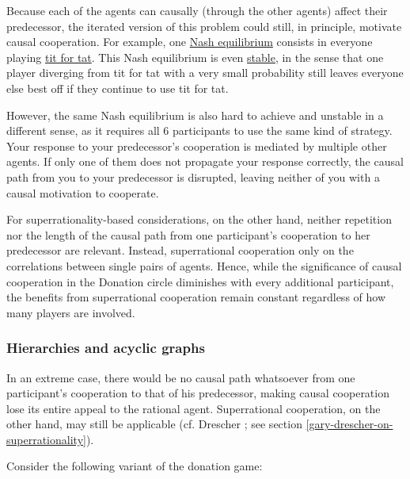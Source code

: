 Because each of the agents can causally (through the other agents)
affect their predecessor, the iterated version of this problem could
still, in principle, motivate causal cooperation. For example, one
\href{https://en.wikipedia.org/wiki/Nash_equilibrium}{Nash
equilibrium} consists in everyone playing
\href{https://en.wikipedia.org/wiki/Tit_for_tat}{tit for tat}.
This Nash equilibrium is even
\href{https://en.wikipedia.org/wiki/Nash_equilibrium\#Stability}{stable},
in the sense that one player diverging from tit for tat with a very
small probability still leaves everyone else best off if they continue
to use tit for tat.

However, the same Nash equilibrium is also hard to achieve and unstable
in a different sense, as it requires all 6 participants to use the same
kind of strategy. Your response to your predecessor's cooperation is
mediated by multiple other agents. If only one of them does not
propagate your response correctly, the causal path from you to your
predecessor is disrupted, leaving neither of you with a causal
motivation to cooperate.

For superrationality-based considerations, on the other hand, neither
repetition nor the length of the causal path from one participant's
cooperation to her predecessor are relevant. Instead, superrational
cooperation only on the correlations between single pairs of agents.
Hence, while the significance of causal cooperation in the Donation
circle diminishes with every additional participant, the benefits from
superrational cooperation remain constant regardless of how many players
are involved.

\hypertarget{hierarchies-and-acyclic-graphs}{\subsubsection{Hierarchies
and acyclic graphs}\label{hierarchies-and-acyclic-graphs}}

In an extreme case, there would be no causal path whatsoever from one
participant's cooperation to that of his predecessor, making causal
cooperation lose its entire appeal to the rational agent. Superrational
cooperation, on the other hand, may still be applicable (cf.
Drescher \citeyear{Drescher2006-ky}; see
section \ref{gary-drescher-on-superrationality}).

Consider the following variant of the donation game:

